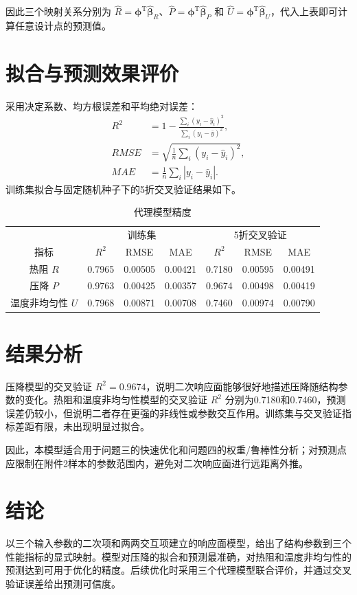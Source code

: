 \documentclass[UTF8,a4paper,12pt]{ctexart}
\begin{document}
因此三个映射关系分别为 $\hat R=\boldsymbol\phi^\mathrm T\hat{\boldsymbol\beta}_R$、$\hat P=\boldsymbol\phi^\mathrm T\hat{\boldsymbol\beta}_P$ 和 $\hat U=\boldsymbol\phi^\mathrm T\hat{\boldsymbol\beta}_U$，代入上表即可计算任意设计点的预测值。

\section{拟合与预测效果评价}
采用决定系数、均方根误差和平均绝对误差：
\begin{align}
R^2&=1-\frac{\sum_i(y_i-\hat y_i)^2}{\sum_i(y_i-\bar y)^2},\\
RMSE&=\sqrt{\frac1n\sum_i(y_i-\hat y_i)^2},\\
MAE&=\frac1n\sum_i|y_i-\hat y_i|.
\end{align}
训练集拟合与固定随机种子下的5折交叉验证结果如下。

\begin{table}[h]
\centering\caption{代理模型精度}
\begin{tabular}{c|ccc|ccc}
\toprule
&\multicolumn{3}{c|}{训练集}&\multicolumn{3}{c}{5折交叉验证}\\
指标&$R^2$&RMSE&MAE&$R^2$&RMSE&MAE\\\midrule
热阻 $R$&0.7965&0.00505&0.00421&0.7180&0.00595&0.00491\\
压降 $P$&0.9763&0.00425&0.00357&0.9674&0.00498&0.00419\\
温度非均匀性 $U$&0.7968&0.00871&0.00708&0.7460&0.00974&0.00790\\
\bottomrule
\end{tabular}
\end{table}

\section{结果分析}
压降模型的交叉验证 $R^2=0.9674$，说明二次响应面能够很好地描述压降随结构参数的变化。热阻和温度非均匀性模型的交叉验证 $R^2$ 分别为0.7180和0.7460，预测误差仍较小，但说明二者存在更强的非线性或参数交互作用。训练集与交叉验证指标差距有限，未出现明显过拟合。

因此，本模型适合用于问题三的快速优化和问题四的权重/鲁棒性分析；对预测点应限制在附件2样本的参数范围内，避免对二次响应面进行远距离外推。

\section{结论}
以三个输入参数的二次项和两两交互项建立的响应面模型，给出了结构参数到三个性能指标的显式映射。模型对压降的拟合和预测最准确，对热阻和温度非均匀性的预测达到可用于优化的精度。后续优化时采用三个代理模型联合评价，并通过交叉验证误差给出预测可信度。
\end{document}
